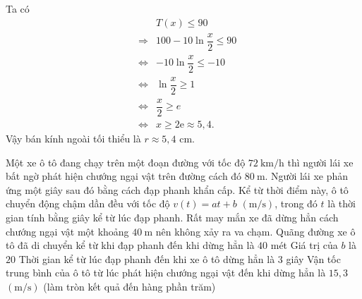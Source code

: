 \begin{ex}
{	Ta có
	\allowdisplaybreaks
	\begin{eqnarray*}
		&&T(x) \le 90\\
		&\Rightarrow &100 - 10 \ln \dfrac{x}{2} \le 90 \\
		&\Leftrightarrow &-10 \ln \dfrac{x}{2} \le -10\\
		&\Leftrightarrow &\ln \dfrac{x}{2} \ge 1\\
		&\Leftrightarrow &\dfrac{x}{2}\ge e\\
		&\Leftrightarrow &x\ge 2\mathrm{e}\approx 5{,}4.
	\end{eqnarray*}
	Vậy bán kính ngoài tối thiểu là $r \approx 5{,}4$ cm.
	}
\end{ex}

%

\begin{ex}%
	Một xe ô tô đang chạy trên một đoạn đường với tốc độ $72 \mathrm{~km} / \mathrm{h}$ thì người lái xe bất ngờ phát hiện chướng ngại vật trên đường cách đó $80 \mathrm{~m}$. Người lái xe phản ứng một giây sau đó bằng cách đạp phanh khẩn cấp. Kể từ thời điểm này, ô tô chuyển động chậm dần đều với tốc độ $v(t)=a t+b$ $(\mathrm{m} / \mathrm{s})$, trong đó $t$ là thời gian tính bằng giây kể từ lúc đạp phanh. Rất may mắn xe đã dừng hẳn cách chướng ngại vật một khoảng $40 \mathrm{~m}$ nên không xảy ra va chạm.
	\choiceTF
	{\True Quãng đường xe ô tô đã di chuyển kể từ khi đạp phanh đến khi dừng hẳn là $40$ mét}
	{\True Giá trị của $b$ là $20$}
	{Thời gian kể từ lúc đạp phanh đến khi xe ô tô dừng hẳn là $3$ giây}
	{Vận tốc trung bình của ô tô từ lúc phát hiện chướng ngại vật đến khi dừng hẳn là $15{,}3$ $(\mathrm{m} / \mathrm{s})$ (làm tròn kết quả đến hàng phần trăm)}
\end{ex}

